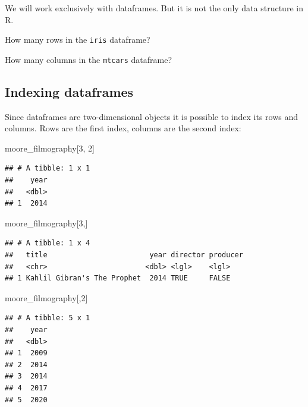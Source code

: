 \documentclass[
]{book}
\makeatletter
\newenvironment{Shaded}{\begin{snugshade}}{\end{snugshade}}
\newcommand{\DecValTok}[1]{\textcolor[rgb]{0.00,0.00,0.81}{#1}}
\newcommand{\NormalTok}[1]{#1}
\newenvironment{kframe}{%
\medskip{}
\setlength{\fboxsep}{.8em}
 \def\at@end@of@kframe{}%
 \ifinner\ifhmode%
  \def\at@end@of@kframe{\end{minipage}}%
  \begin{minipage}{\columnwidth}%
 \fi\fi%
 \def\FrameCommand##1{\hskip\@totalleftmargin \hskip-\fboxsep
 \colorbox{shadecolor}{##1}\hskip-\fboxsep
     \hskip-\linewidth \hskip-\@totalleftmargin \hskip\columnwidth}%
 \MakeFramed {\advance\hsize-\width
   \@totalleftmargin\z@ \linewidth\hsize
   \@setminipage}}%
 {\par\unskip\endMakeFramed%
 \at@end@of@kframe}
\newenvironment{rmdblock}[1]
  {
  \begin{itemize}
  \renewcommand{\labelitemi}{
    \raisebox{-.7\height}[0pt][0pt]{
      {\setkeys{Gin}{width=3em,keepaspectratio}\texttt{[image: images/\#1]}}
    }
  }
  \setlength{\fboxsep}{1em}
  \begin{kframe}
  \item
  }
  {
  \end{kframe}
  \end{itemize}
  }
\newenvironment{rmdtask}
  {\begin{rmdblock}{task}}
  {\end{rmdblock}}
\makeatother
\begin{document}
We will work exclusively with dataframes. But it is not the only data structure in R.

\begin{rmdtask}
How many rows in the \texttt{iris} dataframe?
\end{rmdtask}

\begin{rmdtask}
How many columns in the \texttt{mtcars} dataframe?
\end{rmdtask}

\hypertarget{indexing-dataframes}{%
\subsection{Indexing dataframes}\label{indexing-dataframes}}

Since dataframes are two-dimensional objects it is possible to index its rows and columns. Rows are the first index, columns are the second index:

\begin{Shaded}
\begin{Highlighting}[]
\NormalTok{moore_filmography[}\DecValTok{3}\NormalTok{, }\DecValTok{2}\NormalTok{]}
\end{Highlighting}
\end{Shaded}

\begin{verbatim}
## # A tibble: 1 x 1
##    year
##   <dbl>
## 1  2014
\end{verbatim}

\begin{Shaded}
\begin{Highlighting}[]
\NormalTok{moore_filmography[}\DecValTok{3}\NormalTok{,]}
\end{Highlighting}
\end{Shaded}

\begin{verbatim}
## # A tibble: 1 x 4
##   title                        year director producer
##   <chr>                       <dbl> <lgl>    <lgl>   
## 1 Kahlil Gibran's The Prophet  2014 TRUE     FALSE
\end{verbatim}

\begin{Shaded}
\begin{Highlighting}[]
\NormalTok{moore_filmography[,}\DecValTok{2}\NormalTok{]}
\end{Highlighting}
\end{Shaded}

\begin{verbatim}
## # A tibble: 5 x 1
##    year
##   <dbl>
## 1  2009
## 2  2014
## 3  2014
## 4  2017
## 5  2020
\end{verbatim}
\end{document}
